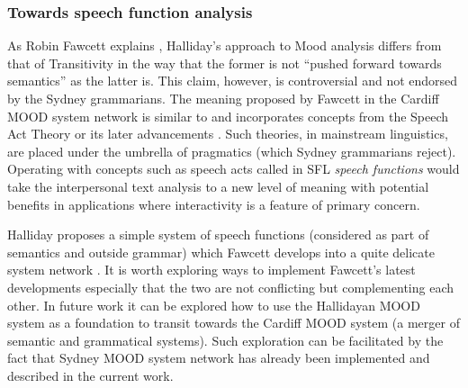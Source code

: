\subsubsection{Towards speech function analysis}

    As Robin Fawcett explains \citep{Fawcett2011}, Halliday's approach to Mood analysis differs from that of Transitivity in the way that the former is not ``pushed forward towards semantics'' as the latter is. This claim, however, is controversial and not endorsed by the Sydney grammarians. %
    The meaning proposed by Fawcett in the Cardiff MOOD system network is similar to and incorporates concepts from the Speech Act Theory \citep{Austin1975} or its later advancements \citep{Searle1969}. Such theories, in mainstream linguistics, are placed under the umbrella of pragmatics (which Sydney grammarians reject). Operating with concepts such as speech acts called in SFL \textit{speech functions} \citep{Hasan84-ways} would take the interpersonal text analysis to a new level of meaning with potential benefits in applications where interactivity is a feature of primary concern.
    

    Halliday proposes a simple system of speech functions \citep[136]{Halliday2013} (considered as part of semantics and outside grammar) which Fawcett develops into a quite delicate system network \citep{Fawcett2011}. It is worth exploring ways to implement Fawcett's latest developments especially that the two are not conflicting but complementing each other. In future work it can be explored how to use the Hallidayan MOOD system as a foundation to transit towards the Cardiff MOOD system (a merger of semantic and grammatical systems). Such exploration can be facilitated by the fact that Sydney MOOD system network has already been implemented and described in the current work.

